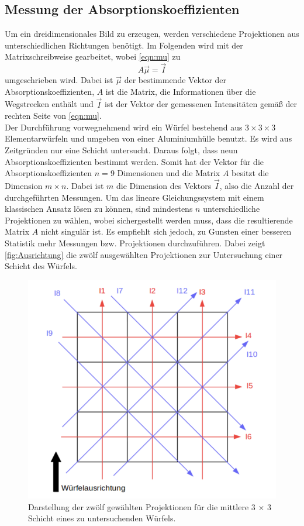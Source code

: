 \subsection{Messung der Absorptionskoeffizienten}
\label{subsec:Absorptionskoeffizient}
Um ein dreidimensionales Bild zu erzeugen, werden verschiedene Projektionen aus unterschiedlichen Richtungen benötigt.
Im Folgenden wird mit der Matrixschreibweise gearbeitet, wobei
\autoref{eqn:mu} zu
\begin{equation}
    A \vec{\mu} = \vec{I}
    \label{eqn:muMatrix}
\end{equation}
umgeschrieben wird. Dabei ist $\vec{\mu}$ der bestimmende Vektor der Absorptionskoeffizienten, $A$ ist die Matrix, die Informationen über die
Wegstrecken enthält und $\vec{I}$ ist der Vektor der gemessenen Intensitäten gemäß der rechten Seite von \autoref{eqn:mu}.\\
Der Durchführung vorwegnehmend wird ein Würfel bestehend aus $3 \times 3 \times 3$ Elementarwürfeln und umgeben von einer Aluminiumhülle benutzt.
Es wird aus Zeitgründen nur eine Schicht untersucht. Daraus folgt, dass neun Absorptionskoeffizienten bestimmt werden.
Somit hat der Vektor für die Absorptionskoeffizienten $n = 9$ Dimensionen und die Matrix $A$ besitzt die 
Dimension $m \times n$. Dabei ist $m$ die Dimension des Vektors $\vec{I}$, also die Anzahl der durchgeführten Messungen.
Um das lineare Gleichungssystem mit einem klassischen Ansatz lösen zu können, sind mindestens $n$ unterschiedliche Projektionen zu wählen,
wobei sichergestellt werden muss, dass die resultierende Matrix $A$ nicht singulär ist. 
Es empfiehlt sich jedoch, zu Gunsten einer besseren Statistik mehr Messungen bzw. Projektionen durchzuführen.
Dabei zeigt \autoref{fig:Ausrichtung} die zwölf ausgewählten Projektionen zur Untersuchung einer Schicht des Würfels.

\begin{figure}[H]
    \centering
    \includegraphics[scale=0.7]{Abbildungen/Ausrichtung.png}
    \caption{Darstellung der zwölf gewählten Projektionen für die mittlere 3 × 3 Schicht eines zu untersuchenden Würfels.\cite{V14}}
    \label{fig:Ausrichtung}
\end{figure}

